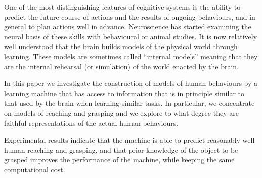 One of the most distinguishing features of cognitive systems is the
ability to predict the future course of actions and the results of
ongoing behaviours, and in general to plan actions well in advance.
Neuroscience has started examining the neural basis of these skills
with behavioural or animal studies. It is now relatively well
understood that the brain builds models of the physical world through
learning. These models are sometimes called ``internal models''
meaning that they are the internal rehearsal (or simulation) of the
world enacted by the brain.

In this paper we investigate the construction of models of human
behaviours by a learning machine that has access to information that
is in principle similar to that used by the brain when learning
similar tasks. In particular, we concentrate on models of reaching and
grasping and we explore to what degree they are faithful
representations of the actual human behaviours.

Experimental results indicate that the machine is able to predict
reasonably well human reaching and grasping, and that prior knowledge
of the object to be grasped improves the performance of the machine,
while keeping the same computational cost.
